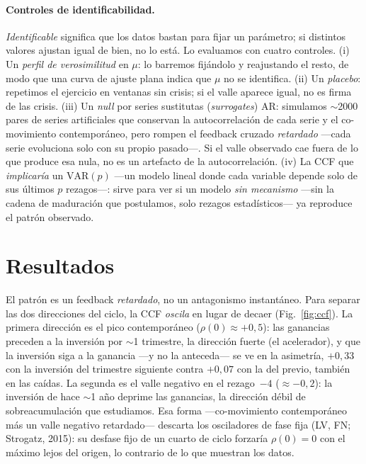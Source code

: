 \documentclass[11pt]{article}
\begin{document}
\paragraph{Controles de identificabilidad.} \emph{Identificable} significa que los datos bastan para
fijar un parámetro; si distintos valores ajustan igual de bien, no lo está. Lo evaluamos con cuatro
controles. (i) Un \emph{perfil de verosimilitud} en $\mu$: lo barremos fijándolo y reajustando el
resto, de modo que una curva de ajuste plana indica que $\mu$ no se identifica. (ii) Un \emph{placebo}: repetimos el ejercicio en ventanas sin crisis; si el valle
aparece igual, no es firma de las crisis. (iii) Un \emph{null} por series sustitutas (\emph{surrogates}) AR: simulamos $\sim$2000 pares de
series artificiales que conservan la autocorrelación de cada serie y el co-movimiento contemporáneo,
pero rompen el feedback cruzado \emph{retardado} ---cada serie evoluciona solo con su propio
pasado---. Si el valle observado cae fuera de lo que produce esa nula, no es un artefacto de la
autocorrelación. (iv) La
CCF que \emph{implicaría} un $\mathrm{VAR}(p)$ ---un modelo lineal donde cada variable depende solo
de sus últimos $p$ rezagos---: sirve para ver si un modelo \emph{sin mecanismo} ---sin la cadena de
maduración que postulamos, solo rezagos estadísticos--- ya reproduce el patrón observado.

\section{Resultados}

El patrón es un feedback \emph{retardado}, no un antagonismo instantáneo. Para separar las dos
direcciones del ciclo, la CCF \emph{oscila} en lugar de decaer (Fig.~\ref{fig:ccf}).
La primera dirección es el pico contemporáneo ($\rho(0)\approx+0{,}5$): las ganancias preceden a la
inversión por $\sim$1 trimestre, la dirección fuerte (el acelerador), y que la inversión siga a la
ganancia ---y no la anteceda--- se ve en la asimetría, $+0{,}33$ con la inversión del trimestre
siguiente contra $+0{,}07$ con la del previo, también en las caídas. La segunda es el valle negativo
en el rezago~$-4$ ($\approx-0{,}2$): la inversión de hace $\sim$1 año deprime las ganancias, la
dirección débil de sobreacumulación que estudiamos. Esa forma ---co-movimiento contemporáneo más un
valle negativo retardado---
descarta los osciladores de fase fija (LV, FN; Strogatz, 2015): su desfase fijo de un cuarto de ciclo forzaría
$\rho(0)=0$ con el máximo lejos del origen, lo contrario de lo que muestran los datos.
\end{document}
